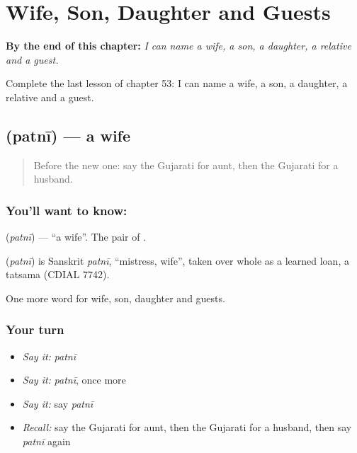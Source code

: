 
\chapter{Wife, Son, Daughter and Guests}
\label{ch:gu-wife-son-daughter-and-guests}

\begin{chapteropening}
\textbf{By the end of this chapter:} \emph{I can name a wife, a son, a daughter, a relative and a guest.}

Complete the last lesson of chapter 53: I can name a wife, a son, a daughter, a relative and a guest.
\end{chapteropening}

\section[\texorpdfstring{\gu{પત્ની} (patnī)}{પત્ની (patnī)}]{ (patnī) — a wife}

\label{lesson:GU-C53-wife}



\begin{quote}
Before the new one: say the Gujarati for aunt, then the Gujarati for a husband.
\end{quote}

\subsection*{You'll want to know: }
\textbf{} (\emph{patnī}) — \textquotedblleft{}a wife\textquotedblright{}. The pair of \textbf{}.

\begin{cousinweb}
\textbf{} (\emph{patnī}) is Sanskrit \emph{patnī}, \textquotedblleft{}mistress, wife\textquotedblright{}, taken over whole as a learned loan, a tatsama (CDIAL 7742).
\end{cousinweb}

\begin{grammarlens}[title={What you've built}]
One more word for wife, son, daughter and guests.
\end{grammarlens}

\subsection*{Your turn}
\begin{itemize}
\raggedright
  \item \emph{Say it:} \emph{patnī}
  \item \emph{Say it:} \emph{patnī}, once more
  \item \emph{Say it:} say \emph{patnī}
  \item \emph{Recall:} say the Gujarati for aunt, then the Gujarati for a husband, then say \emph{patnī} again
\end{itemize}

